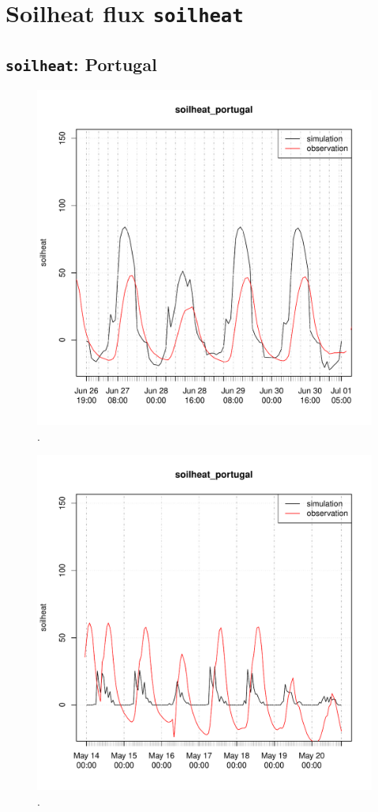 \documentclass{scrreprt}
\begin{document}
\section{Soilheat flux \texttt{soilheat}}

\subsection{\texttt{soilheat}: Portugal}

\begin{figure}[ht]
  \centering
  \includegraphics[width=0.8\hsize]{./plot_soilheat_compare_portugal_HS_2014-06-26_2014-07-01.pdf}
  \caption{.}
  \label{fig:portugal_HS_soilheat1}
\end{figure}

\begin{figure}[ht]
  \centering
  \includegraphics[width=0.8\hsize]{./plot_soilheat_compare_portugal_NSA_2014-05-13_2014-05-20.pdf}
  \caption{.}
  \label{fig:portugal_NSA_soilheat1}
\end{figure}
\end{document}

